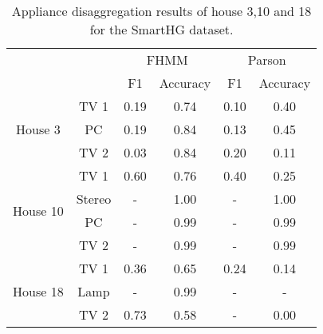 \begin{table}[H]                             
\centering                                   
\begin{tabular}{cc|c|c|c|c|}
\cline{3-6}
\multicolumn{1}{l}{}                            &        & \multicolumn{2}{c|}{FHMM} & \multicolumn{2}{c|}{Parson} \\ \cline{3-6} 
\multicolumn{1}{l}{}                            &        & F1        & Accuracy      & F1         & Accuracy       \\ \hline
\multicolumn{1}{|c|}{\multirow{3}{*}{House 3}}  & TV 1   & 0.19      & 0.74          & 0.10       & 0.40           \\ \cline{2-6} 
\multicolumn{1}{|c|}{}                          & PC     & 0.19      & 0.84          & 0.13       & 0.45           \\ \cline{2-6} 
\multicolumn{1}{|c|}{}                          & TV 2   & 0.03      & 0.84          & 0.20       & 0.11           \\ \hline
\multicolumn{1}{|c|}{\multirow{4}{*}{House 10}} & TV 1   & 0.60      & 0.76          & 0.40       & 0.25           \\ \cline{2-6} 
\multicolumn{1}{|c|}{}                          & Stereo & -         & 1.00          & -          & 1.00           \\ \cline{2-6} 
\multicolumn{1}{|c|}{}                          & PC     & -         & 0.99          & -          & 0.99           \\ \cline{2-6} 
\multicolumn{1}{|c|}{}                          & TV 2   & -         & 0.99          & -          & 0.99           \\ \hline
\multicolumn{1}{|c|}{\multirow{3}{*}{House 18}} & TV 1   & 0.36      & 0.65          & 0.24       & 0.14           \\ \cline{2-6} 
\multicolumn{1}{|c|}{}                          & Lamp   & -         & 0.99          & -          & -              \\ \cline{2-6} 
\multicolumn{1}{|c|}{}                          & TV 2   & 0.73      & 0.58          & -          & 0.00           \\ \hline
\end{tabular}                               
\caption{Appliance disaggregation results of house 3,10 and 18 for the SmartHG dataset.}                     
\label{table:Tab:SHGREAL}                    
\end{table}  